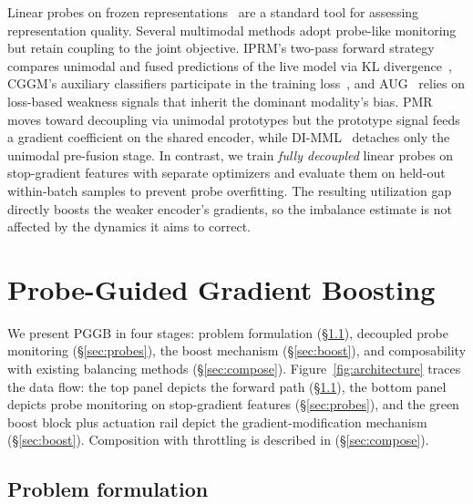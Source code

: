 \documentclass{article} %
\begin{document}
Linear probes on frozen representations~\citep{alain2017understanding} are a standard tool for assessing representation quality. Several multimodal methods adopt probe-like monitoring but retain coupling to the joint objective. IPRM's two-pass forward strategy compares unimodal and fused predictions of the live model via KL divergence~\citep{yang2025iprm}, CGGM's auxiliary classifiers participate in the training loss~\citep{guo2024cggm}, and AUG~\citep{jiang2025aug} relies on loss-based weakness signals that inherit the dominant modality's bias. PMR~\citep{fan2023pmr} moves toward decoupling via unimodal prototypes but the prototype signal feeds a gradient coefficient on the shared encoder, while DI-MML~\citep{fan2024dimml} detaches only the unimodal pre-fusion stage. In contrast, we train \emph{fully decoupled} linear probes on stop-gradient features with separate optimizers and evaluate them on held-out within-batch samples to prevent probe overfitting. The resulting utilization gap directly boosts the weaker encoder's gradients, so the imbalance estimate is not affected by the dynamics it aims to correct.


\section{Probe-Guided Gradient Boosting}
\label{sec:method}

We present PGGB in four stages: problem formulation (\S\ref{sec:problem}), decoupled probe monitoring (\S\ref{sec:probes}), the boost mechanism (\S\ref{sec:boost}), and composability with existing balancing methods (\S\ref{sec:compose}). Figure~\ref{fig:architecture} traces the data flow: the top panel depicts the forward path (\S\ref{sec:problem}), the bottom panel depicts probe monitoring on stop-gradient features (\S\ref{sec:probes}), and the green boost block plus actuation rail depict the gradient-modification mechanism (\S\ref{sec:boost}). Composition with throttling is described in (\S\ref{sec:compose}).

\subsection{Problem formulation}
\label{sec:problem}
\end{document}
